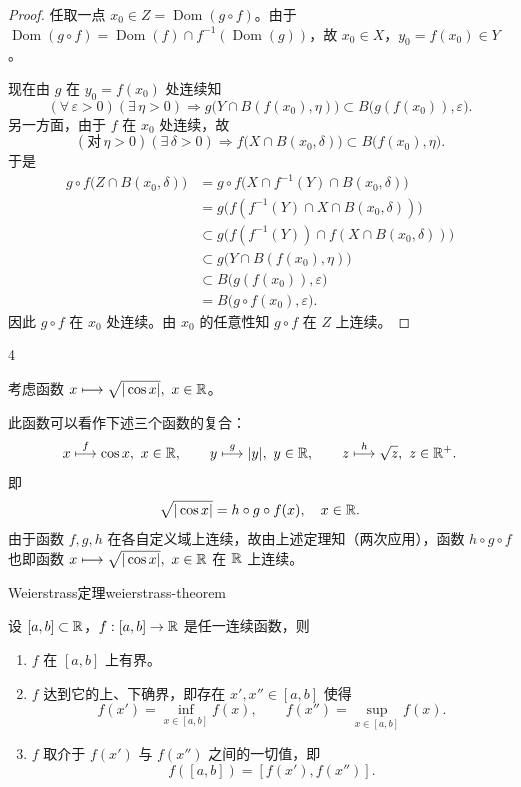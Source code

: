 \begin{proof}

	任取一点 \(x_0\in Z=\operatorname{Dom}(g\circ f)\)。由于 \(\operatorname{Dom}(g\circ f)=\operatorname{Dom}(f)\cap f^{-1}(\operatorname{Dom}(g))\)，故 \(x_0\in X\)，\(y_0=f(x_0)\in Y\)。

	现在由 \(g\) 在 \(y_0=f(x_0)\) 处连续知
	\[
	(\forall\,\varepsilon>0)(\exists\,\eta>0)\Longrightarrow g\bigl(Y\cap B(f(x_0),\eta)\bigr)\subset B\bigl(g(f(x_0)),\varepsilon\bigr).
	\]
	另一方面，由于 \(f\) 在 \(x_0\) 处连续，故
	\[
	(\text{对}\,\eta>0)(\exists\,\delta>0)\Longrightarrow f\bigl(X\cap B(x_0,\delta)\bigr)\subset B\bigl(f(x_0),\eta\bigr).
	\]
	于是
	\[
	\begin{aligned}
	g\circ f\bigl(Z\cap B(x_0,\delta)\bigr)
	&=g\circ f\bigl(X\cap f^{-1}(Y)\cap B(x_0,\delta)\bigr)\\
	&=g\bigl(f(f^{-1}(Y)\cap X\cap B(x_0,\delta))\bigr)\\
	&\subset g\bigl(f(f^{-1}(Y))\cap f(X\cap B(x_0,\delta))\bigr)\\
	&\subset g\bigl(Y\cap B(f(x_0),\eta)\bigr)\\
	&\subset B\bigl(g(f(x_0)),\varepsilon\bigr)\\
	&=B\bigl(g\circ f(x_0),\varepsilon\bigr).
	\end{aligned}
	\]
	因此 \(g\circ f\) 在 \(x_0\) 处连续。由 \(x_0\) 的任意性知 \(g\circ f\) 在 \(Z\) 上连续。

\end{proof}

\begin{sourceexample}{4}

	考虑函数 \(x\longmapsto\sqrt{|\cos x|},\ x\in\R\)。

	此函数可以看作下述三个函数的复合：
	\[
	x\stackrel{f}{\longmapsto}\cos x,\ x\in\mathbb{R},\qquad y\stackrel{g}{\longmapsto}|y|,\ y\in\mathbb{R},\qquad z\stackrel{h}{\longmapsto}\sqrt{z},\ z\in\mathbb{R}^+.
	\]
	即
	\[
	\sqrt{|\cos x|}=h\circ g\circ f(x),\quad x\in\mathbb{R}.
	\]
	由于函数 \(f,g,h\) 在各自定义域上连续，故由上述定理知（两次应用），函数 \(h\circ g\circ f\) 也即函数 \(x\longmapsto\sqrt{|\cos x|},\ x\in\R\) 在 \(\mathbb{R}\) 上连续。

\end{sourceexample}

\begin{mythm}{Weierstrass定理}{weierstrass-theorem}

	设 \([a,b]\subset\mathbb{R}\)，\(f:[a,b]\to\mathbb{R}\) 是任一连续函数，则

	\begin{enumerate}[label=\arabic*)]
		\item \(f\) 在 \([a,b]\) 上有界。

		\item \(f\) 达到它的上、下确界，即存在 \(x',x''\in[a,b]\) 使得
		\[
		f(x')=\inf_{x\in[a,b]}f(x),\qquad f(x'')=\sup_{x\in[a,b]}f(x).
		\]

		\item \(f\) 取介于 \(f(x')\) 与 \(f(x'')\) 之间的一切值，即
		\[
		f([a,b])=[f(x'),f(x'')].
		\]
	\end{enumerate}

\end{mythm}

